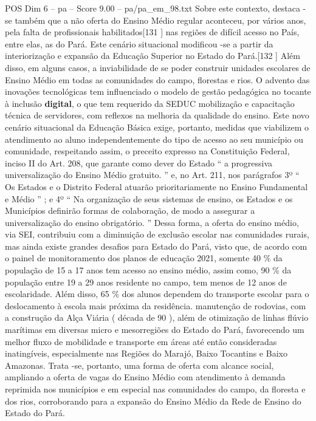 \begin{textsample}{POS Dim 6 – pa – Score 9.00 – pa/pa\_em\_98.txt}  \label{ex:f6_pos_067}
Sobre este contexto, destaca -se também que a não oferta do Ensino Médio regular aconteceu, por vários anos, pela falta de profissionais habilitados[131 ] nas regiões de difícil acesso no País, entre elas, as do Pará.
Este cenário situacional modificou -se a partir da interiorização e expansão da Educação Superior no Estado do Pará.[132 ] Além disso, em alguns casos, a inviabilidade de se poder construir unidades escolares de Ensino Médio em todas as comunidades do campo, florestas e rios.
O advento das inovações tecnológicas tem influenciado o modelo de gestão pedagógica no tocante à inclusão \textbf{digital}, o que tem requerido da SEDUC mobilização e capacitação técnica de servidores, com reflexos na melhoria da qualidade do ensino.
Este novo cenário situacional da Educação Básica exige, portanto, medidas que viabilizem o atendimento ao aluno independentemente do tipo de acesso ao seu município ou comunidade, respeitando assim, o preceito expresso na Constituição Federal, inciso II do Art. 208, que garante como dever do Estado “ a progressiva universalização do Ensino Médio gratuito. ” e, no Art. 211, nos parágrafos 3º “ Os Estados e o Distrito Federal atuarão prioritariamente no Ensino Fundamental e Médio ” ; e 4º “ Na organização de seus sistemas de ensino, os Estados e os Municípios definirão formas de colaboração, de modo a assegurar a universalização do ensino obrigatório. ” Dessa forma, a oferta do ensino médio, via SEI, contribuiu com a diminuição de exclusão escolar nas comunidades rurais, mas ainda existe grandes desafios para Estado do Pará, visto que, de acordo com o painel de monitoramento dos planos de educação 2021, somente 40 \% da população de 15 a 17 anos tem acesso ao ensino médio, assim como, 90 \% da população entre 19 a 29 anos residente no campo, tem menos de 12 anos de escolaridade.
Além disso, 65 \% dos alunos dependem do transporte escolar para o deslocamento à escola mais próxima da residência. manutenção de rodovias, com a construção da Alça Viária ( década de 90 ), além de otimização de linhas flúvio marítimas em diversas micro e mesorregiões do Estado do Pará, favorecendo um melhor fluxo de mobilidade e transporte em áreas até então consideradas inatingíveis, especialmente nas Regiões do Marajó, Baixo Tocantins e Baixo Amazonas.
Trata -se, portanto, uma forma de oferta com alcance social, ampliando a oferta de vagas do Ensino Médio com atendimento à demanda reprimida nos municípios e em especial nas comunidades do campo, da floresta e dos rios, corroborando para a expansão do Ensino Médio da Rede de Ensino do Estado do Pará.

\end{textsample}

